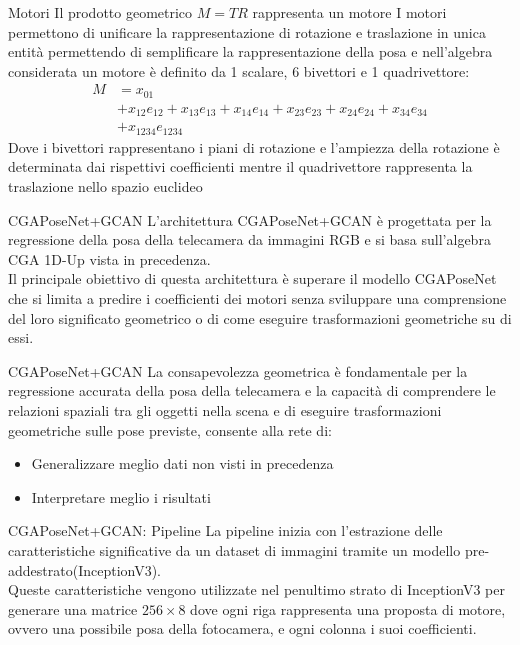 \begin{frame}{Motori}
   Il prodotto geometrico \(M= TR\) rappresenta un motore
   I motori permettono di unificare la rappresentazione di rotazione e traslazione in unica entità permettendo di semplificare la rappresentazione della posa e nell’algebra considerata un motore è definito da 1 scalare, 6 bivettori e 1 quadrivettore:
   \begin{align*}
      M &= x_{01} \\
          &+ x_{12}e_{12}
          + x_{13}e_{13}
          + x_{14}e_{14} 
          + x_{23}e_{23} 
          + x_{24}e_{24} 
          + x_{34}e_{34} \\
          & + x_{1234}e_{1234}
      \end{align*}
      Dove i bivettori rappresentano i piani di rotazione e l'ampiezza della rotazione è determinata dai rispettivi coefficienti mentre il quadrivettore rappresenta la traslazione nello spazio euclideo
\end{frame}

\begin{frame}{CGAPoseNet+GCAN}
   L’architettura CGAPoseNet+GCAN è progettata per la regressione della posa della telecamera da immagini RGB e si basa sull’algebra CGA 1D-Up vista in precedenza. 
   \\Il principale obiettivo di questa architettura è superare il modello CGAPoseNet che si limita a predire i coefficienti dei motori senza sviluppare  una comprensione del loro significato geometrico o di come eseguire trasformazioni geometriche su di essi.
\end{frame}

\begin{frame}{CGAPoseNet+GCAN }
   La consapevolezza geometrica è fondamentale per la regressione accurata della posa della telecamera e la capacità di comprendere le relazioni spaziali tra gli oggetti nella scena e di eseguire trasformazioni geometriche sulle pose previste, consente alla rete di:
   \begin{itemize}
      \item Generalizzare meglio dati non visti in precedenza
      \item Interpretare meglio i risultati
   \end{itemize}
\end{frame}

\begin{frame}{CGAPoseNet+GCAN: Pipeline}
   La pipeline inizia con l’estrazione delle caratteristiche significative da un dataset di immagini tramite un modello pre-addestrato(InceptionV3).
   \\Queste caratteristiche vengono utilizzate nel penultimo strato di InceptionV3 per generare una matrice \(256\times 8\) dove ogni riga rappresenta una proposta di motore, ovvero una possibile posa della fotocamera, e ogni colonna i suoi coefficienti.
\end{frame}

